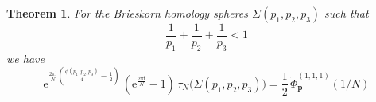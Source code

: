 \documentclass[12pt,reqno]{amsart}
\numberwithin{equation}{section}
\newtheorem{theorem}{Theorem}
\begin{document}
\begin{theorem}
  \label{theorem:invariant_Eichler}
  For the Brieskorn homology spheres $\Sigma(p_1,p_2,p_3)$ such that
  \begin{equation*}
    \frac{1}{p_1} +     \frac{1}{p_2}+     \frac{1}{p_3} <1
  \end{equation*}
  we have
  \begin{equation}
    \label{invariant_and_Eichler}
    \mathrm{e}^{
      \frac{2 \pi \mathrm{i}}{N}
      ( \frac{\phi(p_1,p_2,p_3)}{4} - \frac{1}{2} )
    } \,
    \left(
      \mathrm{e}^{\frac{2 \pi \mathrm{i}}{N}} - 1
    \right)
    \,    \tau_N \bigl( \Sigma(p_1, p_2, p_3) \bigr)
    =
    \frac{1}{2} \,
    \widetilde{\Phi}_{\boldsymbol{p}}^{(1,1,1)}(1/N)
  \end{equation}
\end{theorem}
\end{document}
